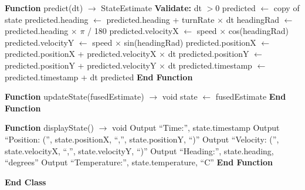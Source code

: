 \documentclass[a4paper,11pt]{article}
\begin{document}
\begin{algorithm}[H]
\begin{algorithmic}[1]
\State \hspace{1cm} \textbf{Function} predict(dt) $\rightarrow$ StateEstimate
\State \hspace{1.5cm} \textbf{Validate:} dt $> 0$
\State \hspace{1.5cm} predicted $\leftarrow$ copy of state
\State \hspace{1.5cm} predicted.heading $\leftarrow$ predicted.heading + turnRate $\times$ dt
\State \hspace{1.5cm} headingRad $\leftarrow$ predicted.heading $\times$ $\pi$ / 180
\State \hspace{1.5cm} predicted.velocityX $\leftarrow$ speed $\times$ cos(headingRad)
\State \hspace{1.5cm} predicted.velocityY $\leftarrow$ speed $\times$ sin(headingRad)
\State \hspace{1.5cm} predicted.positionX $\leftarrow$ predicted.positionX + predicted.velocityX $\times$ dt
\State \hspace{1.5cm} predicted.positionY $\leftarrow$ predicted.positionY + predicted.velocityY $\times$ dt
\State \hspace{1.5cm} predicted.timestamp $\leftarrow$ predicted.timestamp + dt
\State \hspace{1.5cm} \Return predicted
\State \hspace{1cm} \textbf{End Function}

\vspace{0.3cm}

\State \hspace{1cm} \textbf{Function} updateState(fusedEstimate) $\rightarrow$ void
\State \hspace{1.5cm} state $\leftarrow$ fusedEstimate
\State \hspace{1cm} \textbf{End Function}

\vspace{0.3cm}

\State \hspace{1cm} \textbf{Function} displayState() $\rightarrow$ void
\State \hspace{1.5cm} Output ``Time:'', state.timestamp
\State \hspace{1.5cm} Output ``Position: ('', state.positionX, ``,'', state.positionY, ``)''
\State \hspace{1.5cm} Output ``Velocity: ('', state.velocityX, ``,'', state.velocityY, ``)''
\State \hspace{1.5cm} Output ``Heading:'', state.heading, ``degrees''
\State \hspace{1.5cm} Output ``Temperature:'', state.temperature, ``C''
\State \hspace{1cm} \textbf{End Function}

\State \textbf{End Class}

\end{algorithmic}
\end{algorithm}
\end{document}
